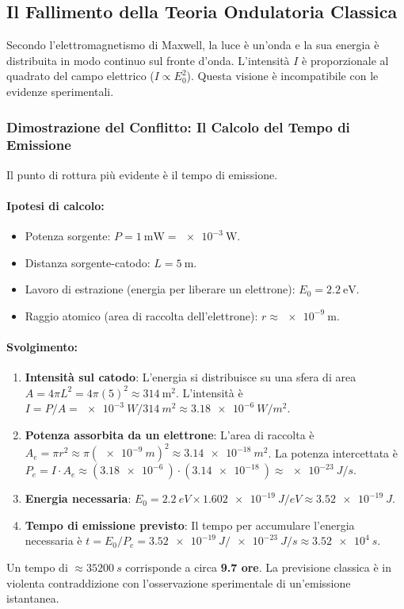 \subsection{Il Fallimento della Teoria Ondulatoria Classica}

Secondo l'elettromagnetismo di Maxwell, la luce è un'onda e la sua energia è distribuita in modo continuo sul fronte d'onda. L'intensità $I$ è proporzionale al quadrato del campo elettrico ($I \propto E_0^2$). Questa visione è incompatibile con le evidenze sperimentali.

\subsubsection*{Dimostrazione del Conflitto: Il Calcolo del Tempo di Emissione}
Il punto di rottura più evidente è il tempo di emissione.
\paragraph{Ipotesi di calcolo:}
\begin{itemize}
    \item Potenza sorgente: $P = \SI{1}{\milli\watt} = \SI{e-3}{\watt}$.
    \item Distanza sorgente-catodo: $L = \SI{5}{\meter}$.
    \item Lavoro di estrazione (energia per liberare un elettrone): $E_0 = \SI{2.2}{\electronvolt}$.
    \item Raggio atomico (area di raccolta dell'elettrone): $r \approx \SI{e-9}{\meter}$.
\end{itemize}

\paragraph{Svolgimento:}
\begin{enumerate}
    \item \textbf{Intensità sul catodo}: L'energia si distribuisce su una sfera di area $A = 4\pi L^2 = 4\pi(5)^2 \approx \SI{314}{\meter^2}$. L'intensità è $I = P/A = \SI{e-3}{W} / \SI{314}{m^2} \approx \SI{3.18e-6}{W/m^2}$.

    \item \textbf{Potenza assorbita da un elettrone}: L'area di raccolta è $A_e = \pi r^2 \approx \pi(\SI{e-9}{m})^2 \approx \SI{3.14e-18}{m^2}$. La potenza intercettata è $P_e = I \cdot A_e \approx (\SI{3.18e-6}{}) \cdot (\SI{3.14e-18}{}) \approx \SI{e-23}{J/s}$.

    \item \textbf{Energia necessaria}: $E_0 = \SI{2.2}{eV} \times \SI{1.602e-19}{J/eV} \approx \SI{3.52e-19}{J}$.

    \item \textbf{Tempo di emissione previsto}: Il tempo per accumulare l'energia necessaria è $t = E_0/P_e = \SI{3.52e-19}{J} / \SI{e-23}{J/s} \approx \SI{3.52e4}{s}$.
\end{enumerate}
Un tempo di $\approx \SI{35200}{s}$ corrisponde a circa \textbf{9.7 ore}. La previsione classica è in violenta contraddizione con l'osservazione sperimentale di un'emissione istantanea.

